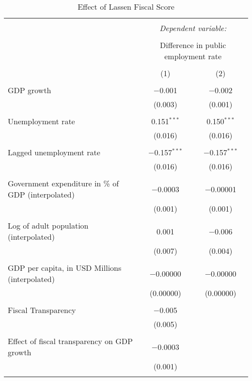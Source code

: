 
\begin{table}[!htbp] \centering 
  \caption{Effect of Lassen Fiscal Score} 
  \label{} 
\begin{tabular}{@{\extracolsep{5pt}}lcc} 
\\[-1.8ex]\hline 
\hline \\[-1.8ex] 
 & \multicolumn{2}{c}{\textit{Dependent variable:}} \\ 
\cline{2-3} 
\\[-1.8ex] & \multicolumn{2}{c}{Difference in public employment rate} \\ 
\\[-1.8ex] & (1) & (2)\\ 
\hline \\[-1.8ex] 
 GDP growth & $-$0.001 & $-$0.002 \\ 
  & (0.003) & (0.001) \\ 
  & & \\ 
 Unemployment rate & 0.151$^{***}$ & 0.150$^{***}$ \\ 
  & (0.016) & (0.016) \\ 
  & & \\ 
 Lagged unemployment rate & $-$0.157$^{***}$ & $-$0.157$^{***}$ \\ 
  & (0.016) & (0.016) \\ 
  & & \\ 
 Government expenditure in \% of GDP (interpolated) & $-$0.0003 & $-$0.00001 \\ 
  & (0.001) & (0.001) \\ 
  & & \\ 
 Log of adult population (interpolated) & 0.001 & $-$0.006 \\ 
  & (0.007) & (0.004) \\ 
  & & \\ 
 GDP per capita, in USD Millions (interpolated) & $-$0.00000 & $-$0.00000 \\ 
  & (0.00000) & (0.00000) \\ 
  & & \\ 
 Fiscal Transparency & $-$0.005 &  \\ 
  & (0.005) &  \\ 
  & & \\ 
 Effect of fiscal transparency on GDP growth & $-$0.0003 &  \\ 
  & (0.001) &  \\ 
  & & \\ 

\end{tabular}
\end{table}
